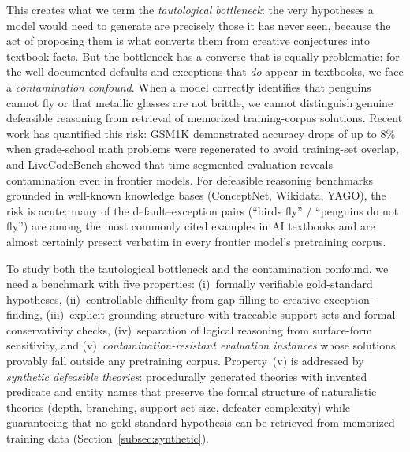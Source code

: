 \documentclass{article}
\theoremstyle{definition}
\begin{document}
This creates what we term the \textit{tautological bottleneck}: the very hypotheses a model would need to generate are precisely those it has never seen, because the act of proposing them is what converts them from creative conjectures into textbook facts. But the bottleneck has a converse that is equally problematic: for the well-documented defaults and exceptions that \emph{do} appear in textbooks, we face a \textit{contamination confound}. When a model correctly identifies that penguins cannot fly or that metallic glasses are not brittle, we cannot distinguish genuine defeasible reasoning from retrieval of memorized training-corpus solutions. Recent work has quantified this risk: GSM1K \cite{zhang2024gsm1k} demonstrated accuracy drops of up to 8\% when grade-school math problems were regenerated to avoid training-set overlap, and LiveCodeBench \cite{jain2025livecodebench} showed that time-segmented evaluation reveals contamination even in frontier models. For defeasible reasoning benchmarks grounded in well-known knowledge bases (ConceptNet, Wikidata, YAGO), the risk is acute: many of the default--exception pairs (``birds fly'' / ``penguins do not fly'') are among the most commonly cited examples in AI textbooks and are almost certainly present verbatim in every frontier model's pretraining corpus.

To study both the tautological bottleneck and the contamination confound, we need a benchmark with five properties: (i)~formally verifiable gold-standard hypotheses, (ii)~controllable difficulty from gap-filling to creative exception-finding, (iii)~explicit grounding structure with traceable support sets and formal conservativity checks, (iv)~separation of logical reasoning from surface-form sensitivity, and (v)~\emph{contamination-resistant evaluation instances} whose solutions provably fall outside any pretraining corpus. Property~(v) is addressed by \emph{synthetic defeasible theories}: procedurally generated theories with invented predicate and entity names that preserve the formal structure of naturalistic theories (depth, branching, support set size, defeater complexity) while guaranteeing that no gold-standard hypothesis can be retrieved from memorized training data (Section~\ref{subsec:synthetic}).
\end{document}
